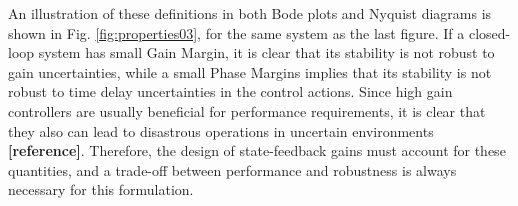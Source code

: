 \documentclass[a4paper,11pt]{book}
\numberwithin{figure}{chapter}
\numberwithin{equation}{chapter}
\numberwithin{table}{chapter}
\theoremstyle{definition}
\newtheorem{definition}{Definition}[chapter]
\newcounter{boxed-theorem}
\newcounter{boxed-definition}
\newenvironment{boxed-definition}[1]
{\begin{shaded} \begin{definition}{#1}}
{\end{definition} \end{shaded}}
\begin{document}
An illustration of these definitions in both Bode plots and Nyquist diagrams is shown in Fig. \ref{fig:properties03}, for the same system as the last figure. If a closed-loop system has small Gain Margin, it is clear that its stability is not robust to gain uncertainties, while a small Phase Margins implies that its stability is not robust to time delay uncertainties in the control actions. Since high gain controllers are usually beneficial for performance requirements, it is clear that they also can lead to disastrous operations in uncertain environments \textbf{[reference]}. Therefore, the design of state-feedback gains must account for these quantities, and a trade-off between performance and robustness is always necessary for this formulation. 


	


\end{document}
